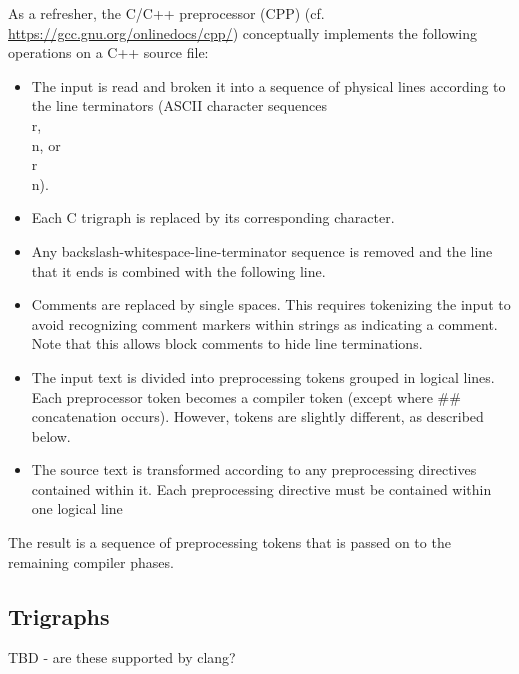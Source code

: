 As a refresher, the C/C++ preprocessor (CPP) (cf. \url{https://gcc.gnu.org/onlinedocs/cpp/}) conceptually implements the following operations on a C++ source file:
\begin{itemize}
	\item The input is read and broken it into a sequence of physical lines according to the line terminators (ASCII character sequences \\r, \\n, or \\r\\n).
	\item Each C trigraph is replaced by its corresponding character.
	\item Any backslash-whitespace-line-terminator sequence is removed and the line that it ends is combined with the following line.
	\item Comments are replaced by single spaces. This requires tokenizing the input to avoid recognizing comment markers within strings as indicating a comment. Note that this allows block comments to hide line terminations.
	\item The input text is divided into preprocessing tokens grouped in logical lines. Each preprocessor token becomes a compiler token (except where \#\# concatenation occurs). However, \acslb tokens are slightly different, as described below.
	\item The source text is transformed according to any preprocessing directives contained within it. Each preprocessing directive must be contained within one logical line
	
\end{itemize}
The result is a sequence of preprocessing tokens that is passed on to the 
remaining compiler phases.

\subsection{Trigraphs}

TBD - are these supported by clang?

